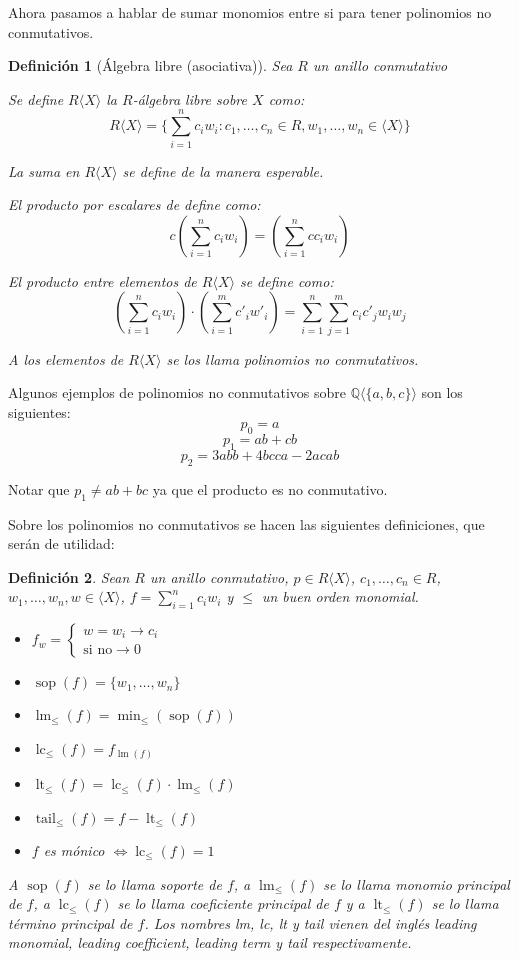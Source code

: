 \documentclass{amsbook} %
\theoremstyle{customstyle}
\newtheorem{definition}{Definición}[section]
\DeclareMathOperator{\sop}{sop}
\DeclareMathOperator{\lm}{lm}
\DeclareMathOperator{\lc}{lc}
\DeclareMathOperator{\lt}{lt}
\DeclareMathOperator{\tail}{tail}
\begin{document}
Ahora pasamos a hablar de sumar monomios entre si para tener polinomios no conmutativos.

\begin{definition}[Álgebra libre (asociativa)]
Sea $R$ un anillo conmutativo

Se define $R⟨X⟩$ la $R$-álgebra libre sobre $X$ como:
\[ R⟨X⟩ = \{∑_{i = 1}^n c_i w_i : c_1, …, c_n ∈ R, w_1, …, w_n ∈ ⟨X⟩\} \]

La suma en $R⟨X⟩$ se define de la manera esperable.

El producto por escalares de define como:
\[ c (∑_{i = 1}^n c_i w_i) = (∑_{i = 1}^n c c_i w_i) \]

El producto entre elementos de $R⟨X⟩$ se define como:
\[ (∑_{i = 1}^n c_i w_i) · (∑_{i = 1}^m c'_i w'_i) = ∑_{i = 1}^n ∑_{j = 1}^m c_i c'_j w_i w_j \]

A los elementos de $R⟨X⟩$ se los llama polinomios no conmutativos.
\end{definition}

Algunos ejemplos de polinomios no conmutativos sobre $ℚ⟨\{a, b, c\}⟩$ son los siguientes:
\[ p_0 = a \]
\[ p_1 = ab + cb \]
\[ p_2 = 3 abb + 4 bcca - 2 acab \]

Notar que $p_1 ≠ ab + bc$ ya que el producto es no conmutativo.

Sobre los polinomios no conmutativos se hacen las siguientes definiciones, que serán de utilidad:

\begin{definition}
Sean $R$ un anillo conmutativo, $p ∈ R⟨X⟩$, $c_1, …, c_n ∈ R$, $w_1, …, w_n, w ∈ ⟨X⟩$, $f = ∑_{i = 1}^n c_i w_i$ y $≤$ un buen orden monomial.
\begin{itemize}
\item $f_w = \left\{\begin{array}{ll} w = w_i → c_i \\ \text{si no} → 0  \end{array} \right.$
\item $\sop(f) = \{w_1, …, w_n\}$
\item $\lm_≤(f) = \min_≤(\sop(f))$
\item $\lc_≤(f) = f_{\lm(f)}$
\item $\lt_≤(f) = \lc_≤(f) · \lm_≤(f)$
\item $\tail_≤(f) = f - \lt_≤(f)$
\item $f$ es mónico $⇔ \lc_≤(f) = 1$
\end{itemize}

A $\sop(f)$ se lo llama soporte de $f$, a $\lm_≤(f)$ se lo llama monomio principal de $f$, a $\lc_≤(f)$ se lo llama coeficiente principal de $f$ y a $\lt_≤(f)$ se lo llama término principal de $f$. Los nombres lm, lc, lt y tail vienen del inglés leading monomial, leading coefficient, leading term y tail respectivamente.

\end{definition}
\end{document}
